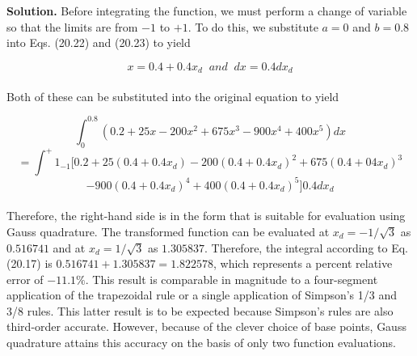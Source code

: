 \documentclass[../main.tex]{subfiles}
\begin{document}
\textbf{Solution.} Before integrating the function, we must perform a change of variable so that
the limits are from $−1$ to $+1$. To do this, we substitute $a = 0$ and $b = 0.8$ into Eqs. (20.22)
and (20.23) to yield

	$$x=0.4+0.4x_{d}  \; \; and \; \; dx=0.4dx_{d}$$\\
Both of these can be substituted into the original equation to yield

	$$\int^{0.8}_{0} (0.2+25x - 200x^2 + 675x^3 - 900x^4 + 400x^5)dx$$ 
	$$= \int^+{1}_{-1} [0.2+25(0.4+0.4x_{d}) - 200(0.4+0.4x_{d})^{2} + 675(0.4 +04x_{d})^{3}$$ 
	$$- 900(0.4 + 0.4x_{d})^{4} + 400(0.4+0.4x_{d})^{5}]0.4dx_{d}$$\\
Therefore, the right-hand side is in the form that is suitable for evaluation using Gauss
quadrature. The transformed function can be evaluated at $x_{d} = −1/\sqrt{3}$ as $0.516741$ and at
$x_{d} = 1/\sqrt{3}$ as $1.305837$. Therefore, the integral according to Eq. (20.17) is $0.516741+
1.305837 = 1.822578$, which represents a percent relative error of $−11.1\%$. This result is
comparable in magnitude to a four-segment application of the trapezoidal rule or a single
application of Simpson's 1/3 and 3/8 rules. This latter result is to be expected because
Simpson's rules are also third-order accurate. However, because of the clever choice of
base points, Gauss quadrature attains this accuracy on the basis of only two function
evaluations.\\
\end{document}
